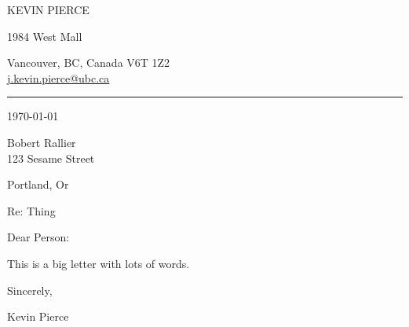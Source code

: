 \documentclass[11pt,letterpaper]{article}
\def\name{Kevin Pierce}
\newcommand{\titlefont}[1]{{\titleface\Large\MakeUppercase{#1}}}
\begin{document}
	
	\titlefont{\name}
	
\smallskip
	\begin{minipage}[t]{0.495\textwidth}
		1984 West Mall\\
		\raggedright Vancouver, BC, Canada V6T 1Z2\\
		\href{mailto:j.kevin.pierce@ubc.ca}{j.kevin.pierce@ubc.ca}\\
	\end{minipage}
\smallskip
\hrule
\bigskip 
\hfill \today \\
\bigskip
\begin{minipage}[t]{0.495\textwidth}
	Bobert Rallier \\
	123 Sesame Street\\
	\raggedright Portland, Or \\
\end{minipage}
\bigskip


{ \sectionface \large Re: Thing}

\bigskip

Dear Person:
\bigskip


\par This is a big letter with lots of words.
\lipsum[1]

\bigskip
\lipsum[2]

\bigskip

\lipsum[3]
\bigskip

\noindent Sincerely,

\bigskip

\noindent Kevin Pierce
	\vfill
\end{document}
